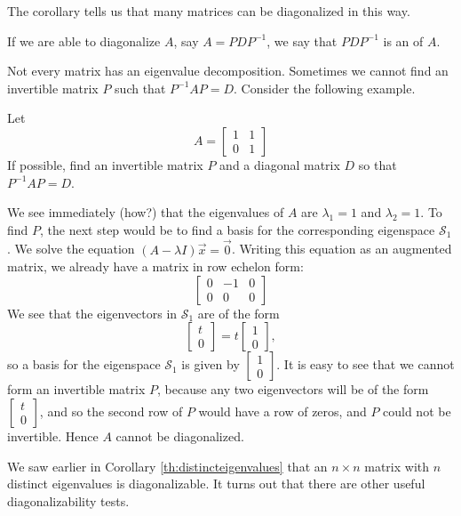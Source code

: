 \documentclass{ximera}
\begin{document}
The corollary tells us that many matrices can be diagonalized in this way.
\begin{definition}\label{def:eigdecomposition}
If we are able to diagonalize $A$, say $A=PDP^{-1}$, we say that $PDP^{-1}$ is an  of $A$.
\end{definition}
Not every matrix has an eigenvalue decomposition. Sometimes we cannot find an invertible matrix $P$ such that $P^{-1}AP=D$.  Consider the following example.

\begin{example}\label{ex:impossiblediagonalize}
Let
\begin{equation*}
A =
\begin{bmatrix}
1 & 1 \\
0 & 1
\end{bmatrix}
\end{equation*}
If possible, find an invertible matrix $P$ and a diagonal matrix $D$ so that $P^{-1}AP=D$.


\begin{explanation}
We see immediately (how?) that the eigenvalues of $A$ are $\lambda_1 =1$ and  $\lambda_2=1$.
To find $P$, the next step would be to find a basis for the corresponding eigenspace $\mathcal{S}_1$.  We solve the equation $\left( A - \lambda I \right) \vec{x} = \vec{0}$.
Writing this equation as an augmented matrix, we already have a matrix in row echelon form:
\begin{equation*}
\left[\begin{array}{cc|c}  
0 & -1 & 0 \\
0 & 0 & 0
 \end{array}\right]
\end{equation*}
We see that the eigenvectors in $\mathcal{S}_1$ are of the form
$$
\begin{bmatrix}
t \\
0
\end{bmatrix}
=t\begin{bmatrix}
1 \\
0
\end{bmatrix},
$$
so a basis for the eigenspace $\mathcal{S}_1$ is given by 
$\begin{bmatrix}
1 \\
0
\end{bmatrix}$.
It is easy to see that we cannot form an invertible matrix $P$, because any two eigenvectors will be of the form 
$\begin{bmatrix}
t \\
0
\end{bmatrix}$,
and so the second row of $P$ would have a row of zeros, and $P$ could not be invertible.  Hence $A$ cannot be diagonalized.
\end{explanation}
\end{example}
We saw earlier in Corollary \ref{th:distincteigenvalues} that an $n \times n$ matrix with $n$ distinct eigenvalues is diagonalizable.  It turns out that there are other useful diagonalizability tests.
\end{document}
